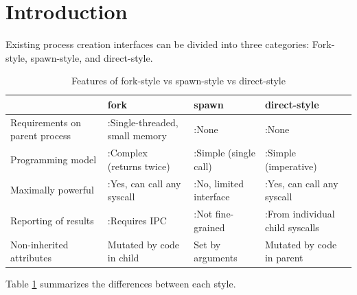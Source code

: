 \documentclass[letterpaper,twocolumn,10pt]{article}
\newcommand{\cmark}{\ding{51}}
\newcommand{\xmark}{\ding{55}}
\newcommand{\tbad}{\xmark:}
\newcommand{\tgood}{\cmark:}
\begin{document}
\section{Introduction}\label{introduction}
Existing process creation interfaces can be divided into three categories:
Fork-style, spawn-style, and direct-style.
\begin{table}
\begin{tabular}{l|l|l|l}
 & fork & spawn & direct-style\\
\hline
Requirements on parent process & \tbad Single-threaded, small memory & \tgood None & \tgood None\\
Programming model & \tbad Complex (returns twice) & \tgood Simple (single call) & \tgood Simple (imperative)\\
Maximally powerful & \tgood Yes, can call any syscall & \tbad No, limited interface & \tgood Yes, can call any syscall\\
Reporting of results & \tbad Requires IPC & \tbad Not fine-grained & \tgood From individual child syscalls\\
Non-inherited attributes & Mutated by code in child & Set by arguments & Mutated by code in parent\\
\end{tabular}
\caption{Features of fork-style vs spawn-style vs direct-style}
\label{tab:styles}
\end{table}

Table \ref{tab:styles} summarizes the differences between each style.
\end{document}
